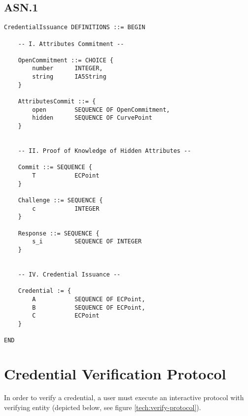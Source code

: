 \subsection*{ASN.1}
\begin{verbatim}
CredentialIssuance DEFINITIONS ::= BEGIN

    -- I. Attributes Commitment --

    OpenCommitment ::= CHOICE {
        number      INTEGER,
        string      IA5String
    }

    AttributesCommit ::= {
        open        SEQUENCE OF OpenCommitment,
        hidden      SEQUENCE OF CurvePoint
    }
    
    
    -- II. Proof of Knowledge of Hidden Attributes --
        
    Commit ::= SEQUENCE {
        T           ECPoint
    }

    Challenge ::= SEQUENCE {
        c           INTEGER
    }

    Response ::= SEQUENCE {
        s_i         SEQUENCE OF INTEGER
    }
    
    
    -- IV. Credential Issuance --
    
    Credential := {
        A           SEQUENCE OF ECPoint,
        B           SEQUENCE OF ECPoint,
        C           ECPoint
    }   
    
END
\end{verbatim}


\clearpage
\section{Credential Verification Protocol}

In order to verify a credential, a user must execute an interactive protocol with verifying entity (depicted below, see figure \ref{tech:verify-protocol}).

